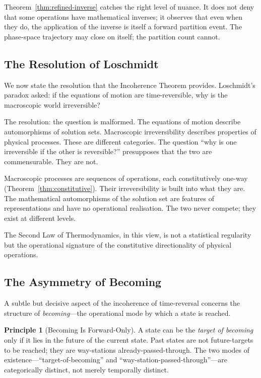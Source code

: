 \documentclass[twocolumn,10pt,a4paper]{article}
\theoremstyle{definition}
\newtheorem{principle}[theorem]{Principle}
\theoremstyle{remark}
\begin{document}
Theorem~\ref{thm:refined-inverse} catches the right level of nuance. It does not deny that some operations have mathematical inverses; it observes that even when they do, the application of the inverse is itself a forward partition event. The phase-space trajectory may close on itself; the partition count cannot.

\subsection{The Resolution of Loschmidt}

We now state the resolution that the Incoherence Theorem provides. Loschmidt's paradox asked: if the equations of motion are time-reversible, why is the macroscopic world irreversible?

The resolution: the question is malformed. The equations of motion describe automorphisms of solution sets. Macroscopic irreversibility describes properties of physical processes. These are different categories. The question ``why is one irreversible if the other is reversible?'' presupposes that the two are commensurable. They are not.

Macroscopic processes are sequences of operations, each constitutively one-way (Theorem~\ref{thm:constitutive}). Their irreversibility is built into what they are. The mathematical automorphisms of the solution set are features of representations and have no operational realisation. The two never compete; they exist at different levels.

The Second Law of Thermodynamics, in this view, is not a statistical regularity but the operational signature of the constitutive directionality of physical operations.

\subsection{The Asymmetry of Becoming}
\label{sec:becoming}

A subtle but decisive aspect of the incoherence of time-reversal concerns the structure of \emph{becoming}---the operational mode by which a state is reached.

\begin{principle}[Becoming Is Forward-Only]
\label{princ:becoming}
A state can be the \emph{target of becoming} only if it lies in the future of the current state. Past states are not future-targets to be reached; they are way-stations already-passed-through. The two modes of existence---``target-of-becoming'' and ``way-station-passed-through''---are categorically distinct, not merely temporally distinct.
\end{principle}
\end{document}
